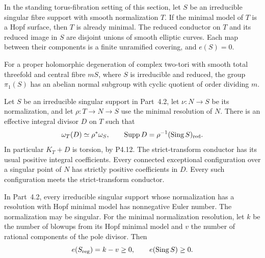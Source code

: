 
\begin{proposition}[P4.24]\hypertarget{tag-02WW}{}\label{night:P4.24}\label{stmt:P4.24}


In the standing torus-fibration setting of this section, let $S$ be an irreducible
singular fibre support with smooth normalization $T$.
If the minimal model of $T$ is a Hopf surface, then
$T$ is already minimal. The reduced conductor on $T$
and its reduced image in $S$ are disjoint unions of
smooth elliptic curves. Each map between their
components is a finite unramified covering, and
$e(S)=0$.
\end{proposition}

\begin{proposition}[P4R.1]\hypertarget{tag-02Y2}{}\label{night:P4R.1}\label{stmt:P4R.1}


For a proper holomorphic degeneration of complex two-tori with
smooth total threefold and central fibre $mS$, where $S$ is
irreducible and reduced, the group $\pi_1(S)$ has an abelian
normal subgroup with cyclic quotient of order dividing $m$.
\end{proposition}

\begin{proposition}[P4R.6]\hypertarget{tag-02YI}{}\label{night:P4R.6}\label{stmt:P4R.6}


Let $S$ be an irreducible singular support in
Part~4.2, let $\nu:N\to S$ be its normalization,
and let $\rho:T\to N\to S$ use the minimal
resolution of $N$. There is an effective integral
divisor $D$ on $T$ such that
\[
 \omega_T(D)\simeq\rho^*\omega_S,
 \qquad \operatorname{Supp}D
       =\rho^{-1}(\operatorname{Sing}S)_{\rm red}.
\]
In particular $K_T+D$ is torsion, by P4.12.
The strict-transform conductor has its usual
positive integral coefficients. Every connected
exceptional configuration over a singular point
of $N$ has strictly positive coefficients in $D$.
Every such configuration meets the strict-transform
conductor.
\end{proposition}

\begin{proposition}[P4R.8]\hypertarget{tag-02YK}{}\label{night:P4R.8}\label{stmt:P4R.8}


In Part~4.2, every irreducible singular support
whose normalization has a resolution with Hopf
minimal model has nonnegative Euler number.
The normalization may be singular. For the
minimal normalization resolution, let $k$ be
the number of blowups from its Hopf minimal
model and $v$ the number of rational components
of the pole divisor. Then
\[
 e(S_{\rm reg})=k-v\ge0,\qquad
 e(\operatorname{Sing}S)\ge0.
\]
\end{proposition}

